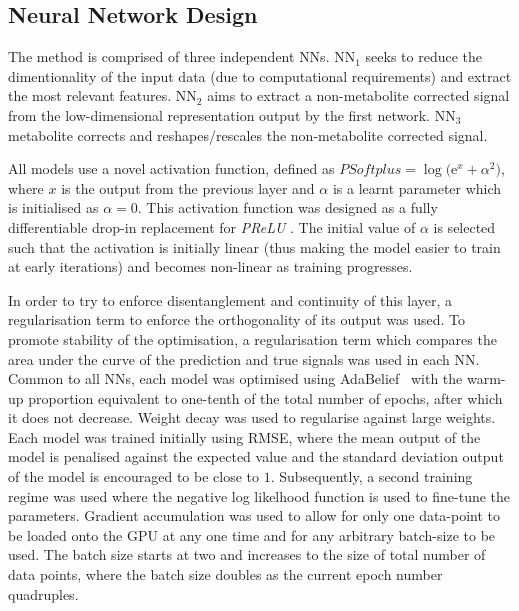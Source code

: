         \subsection{Neural Network Design} \label{sec:a_bayesian_neural_network-based_method_for_the_extraction_of_a_metabolite_corrected_arterial_input_function_from_dynamic_pbr28_pet_appendix_methods_neural_network_design}
            The method is comprised of three independent \glspl{NN}. \gls{NN}$_1$ seeks to reduce the dimentionality of the input data (due to computational requirements) and extract the most relevant features. \gls{NN}$_2$ aims to extract a non-metabolite corrected signal from the low-dimensional representation output by the first network. \gls{NN}$_3$ metabolite corrects and reshapes/rescales the non-metabolite corrected signal. 
        
            All models use a novel activation function, defined as $PSoftplus = \log\big(\mathrm{e}^{x} + \alpha^2 \big)$, where $x$ is the output from the previous layer and $\alpha$ is a learnt parameter which is initialised as $\alpha = 0$.  This activation function was designed as a fully differentiable drop-in replacement for \textit{PReLU} \parencite{Ciuparu2020Soft++Architectures}. The initial value of $\alpha$ is selected such that the activation is initially linear (thus making the model easier to train at early iterations) and becomes non-linear as training progresses.
    
            In order to try to enforce disentanglement and continuity of this layer, a regularisation term to enforce the orthogonality of its output was used. To promote stability of the optimisation, a regularisation term which compares the area under the curve of the prediction and true signals was used in each \gls{NN}. Common to all \glspl{NN}, each model was optimised using AdaBelief~\parencite{Zhuang2020AdaBeliefGradients} with the warm-up proportion equivalent to one-tenth of the total number of epochs, after which it does not decrease. Weight decay was used to regularise against large weights. Each model was trained initially using \gls{RMSE}, where the mean output of the model is penalised against the expected value and the standard deviation output of the model is encouraged to be close to $1$. Subsequently, a second training regime was used where the negative log likelhood function is used to fine-tune the parameters. Gradient accumulation was used to allow for only one data-point to be loaded onto the \gls{GPU} at any one time and for any arbitrary batch-size to be used. The batch size starts at two and increases to the size of total number of data points, where the batch size doubles as the current epoch number quadruples.

